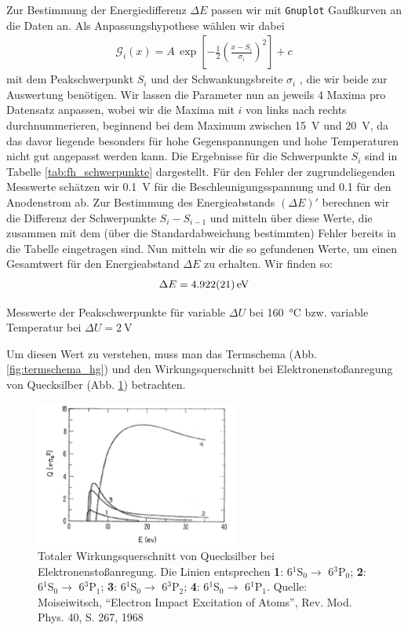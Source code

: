 \documentclass[11pt, a4paper]{article}
\begin{document}
Zur Bestimmung der Energiedifferenz $\Delta E$ passen wir mit \texttt{Gnuplot} Gaußkurven an die Daten an.
Als Anpassungshypothese wählen wir dabei
\begin{align}
\mathcal{G}_i(x)=A\,\exp\left[-\frac{1}{2}\left(\frac{x-S_i}{\sigma_i}\right)^2\right] + c
\label{eq:fh_fithypothese}
\end{align}
mit dem Peakschwerpunkt $S_i$ und der Schwankungsbreite $\sigma_i$ , die wir beide zur Auswertung benötigen.
Wir lassen die Parameter nun an jeweils 4 Maxima pro Datensatz anpassen, wobei wir die Maxima mit $i$ von links nach rechts durchnummerieren, beginnend bei dem Maximum zwischen \SI{15}{\volt} und \SI{20}{\volt}, da das davor liegende besonders für hohe Gegenspannungen und hohe Temperaturen nicht gut angepasst werden kann.
Die Ergebnisse für die Schwerpunkte $S_i$ sind in Tabelle \ref{tab:fh_schwerpunkte} dargestellt.
Für den Fehler der zugrundeliegenden Messwerte schätzen wir \SI{0.1}{\volt} für die Beschleunigungsspannung und \num{0.1} für den Anodenstrom ab.
Zur Bestimmung des Energieabstands $\left(\Delta E\right)'$ berechnen wir die Differenz der Schwerpunkte $S_i-S_{i-1}$ und mitteln über diese Werte, die zusammen mit dem (über die Standardabweichung bestimmten) Fehler bereits in die Tabelle eingetragen sind.
Nun mitteln wir die so gefundenen Werte, um einen Gesamtwert für den Energieabstand $\Delta E$ zu erhalten.
Wir finden so:
\begin{align*}
\Delta E = \SI{4.922+-0.021}{\electronvolt}
\end{align*}
\begin{table}[h]
\centering
\resizebox{\columnwidth}{!}{%
}
\caption{Messwerte der Peakschwerpunkte für variable $\Delta U$ bei \SI{160}{\degreeCelsius} bzw. variable Temperatur bei $\Delta U=\SI{2}{\volt}$}
\label{tab:fh_schwerpunkte}
\end{table}
Um diesen Wert zu verstehen, muss man das Termschema (Abb. \ref{fig:termschema_hg}) und den Wirkungsquerschnitt bei Elektronenstoßanregung von Quecksilber (Abb. \ref{fig:wirkungsquerschnitt_hg}) betrachten.
\begin{figure}[h]
\centering
\includegraphics[width=0.6\textwidth]{./figures/wirkungsquerschnitt_hg.pdf}
\caption{Totaler Wirkungsquerschnitt von Quecksilber bei Elektronenstoßanregung. Die Linien entsprechen \textbf{1}: 6$^1$S$_0 \rightarrow$ 6$^3$P$_0$; \textbf{2}: 6$^1$S$_0 \rightarrow$ 6$^3$P$_1$; \textbf{3}: 6$^1$S$_0 \rightarrow$ 6$^3$P$_2$; \textbf{4}: 6$^1$S$_0 \rightarrow$ 6$^1$P$_1$. Quelle: Moiseiwitsch,
"`Electron Impact Excitation of Atoms"', Rev. Mod. Phys. 40, S. 267, 1968}
\label{fig:wirkungsquerschnitt_hg}
\end{figure}
\end{document}
